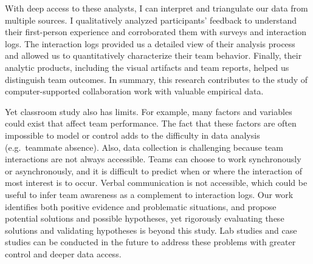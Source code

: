With deep access to these analysts, I can interpret and triangulate our data from multiple sources. I qualitatively analyzed participants' feedback to understand their first-person experience and corroborated them with surveys and interaction logs. The interaction logs provided us a detailed view of their analysis process and allowed us to quantitatively characterize their team behavior. Finally, their analytic products, including the visual artifacts and team reports, helped us distinguish team outcomes. In summary, this research contributes to the study of computer-supported collaboration work with valuable empirical data.

Yet classroom study also has limits. For example, many factors and
variables could exist that affect team performance. The fact that these
factors are often impossible to model or control adds to the difficulty
in data analysis (e.g.~teammate absence). Also, data collection is
challenging because team interactions are not always accessible. Teams
can choose to work synchronously or asynchronously, and it is difficult
to predict when or where the interaction of most interest is to occur.
Verbal communication is not accessible, which could be useful to infer
team awareness as a complement to interaction logs. Our work identifies
both positive evidence and problematic situations, and propose potential
solutions and possible hypotheses, yet rigorously evaluating these
solutions and validating hypotheses is beyond this study. Lab studies
and case studies can be conducted in the future to address these
problems with greater control and deeper data access.
